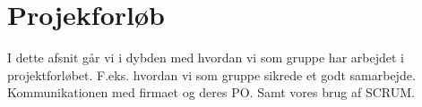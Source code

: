 \section{Projekforløb}
I dette afsnit går vi i dybden med hvordan vi som gruppe har arbejdet i projektforløbet. F.eks. hvordan vi som gruppe sikrede et godt samarbejde. Kommunikationen med firmaet og deres PO. Samt vores brug af SCRUM.



